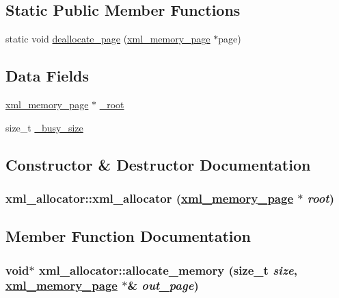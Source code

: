 \subsection*{Static Public Member Functions}
\begin{CompactItemize}
\item 
static void \hyperlink{structxml__allocator_1c6bfe15a257a094f55659f8d71c209e}{deallocate\_\-page} (\hyperlink{structxml__memory__page}{xml\_\-memory\_\-page} $\ast$page)
\end{CompactItemize}
\subsection*{Data Fields}
\begin{CompactItemize}
\item 
\hyperlink{structxml__memory__page}{xml\_\-memory\_\-page} $\ast$ \hyperlink{structxml__allocator_38082e85b23743620a257f997a00bb69}{\_\-root}
\item 
size\_\-t \hyperlink{structxml__allocator_4908b4aaa8cbbc3bf936ab8a938053c0}{\_\-busy\_\-size}
\end{CompactItemize}


\subsection{Constructor \& Destructor Documentation}
\hypertarget{structxml__allocator_d41b1a18595953aa71a470b45921c0fd}{
\subsubsection[xml\_\-allocator]{\setlength{\rightskip}{0pt plus 5cm}xml\_\-allocator::xml\_\-allocator (\hyperlink{structxml__memory__page}{xml\_\-memory\_\-page} $\ast$ {\em root})}}
\label{structxml__allocator_d41b1a18595953aa71a470b45921c0fd}




\subsection{Member Function Documentation}
\hypertarget{structxml__allocator_fac0b9fac2c2962972f60d0346eb4f39}{
\subsubsection[allocate\_\-memory]{\setlength{\rightskip}{0pt plus 5cm}void$\ast$ xml\_\-allocator::allocate\_\-memory (size\_\-t {\em size}, \hyperlink{structxml__memory__page}{xml\_\-memory\_\-page} $\ast$\& {\em out\_\-page})}}
\label{structxml__allocator_fac0b9fac2c2962972f60d0346eb4f39}


